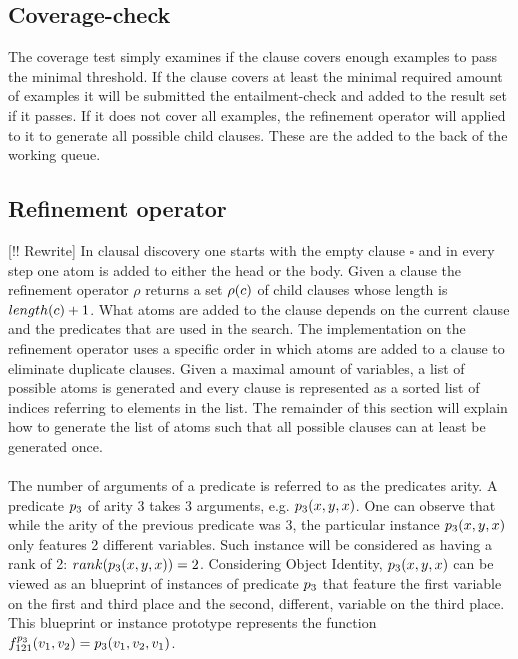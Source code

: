 \subsection{Coverage-check}
The coverage test simply examines if the clause covers enough examples to pass the minimal threshold.
If the clause covers at least the minimal required amount of examples it will be submitted the entailment-check and added to the result set if it passes.
If it does not cover all examples, the refinement operator will applied to it to generate all possible child clauses.
These are the added to the back of the working queue.

\subsection{Refinement operator}
[!! Rewrite]
In clausal discovery one starts with the empty clause $\square$ and in every step one atom is added to either the head or the body.
Given a clause  the refinement operator $\rho$ returns a set $\rho(c)$ of child clauses whose length is $length(c) + 1$.
What atoms are added to the clause depends on the current clause and the predicates that are used in the search.
The implementation on the refinement operator uses a specific order in which atoms are added to a clause to eliminate duplicate clauses.
Given a maximal amount of variables, a list of possible atoms is generated and every clause is represented as a sorted list of indices referring to elements in the list.
The remainder of this section will explain how to generate the list of atoms such that all possible clauses can at least be generated once.
\\\\
The number of arguments of a predicate is referred to as the predicates arity.
A predicate $p_3$ of arity 3 takes 3 arguments, e.g. $p_3(x, y, x)$.
One can observe that while the arity of the previous predicate was 3, the particular instance $p_3(x, y, x)$ only features 2 different variables.
Such instance will be considered as having a rank of 2: $rank(p_3(x, y, x)) = 2$.
Considering Object Identity, $p_3(x, y, x)$ can be viewed as an blueprint of instances of predicate $p_3$ that feature the first variable on the first and third place and the second, different, variable on the third place.
This blueprint or instance prototype represents the function $f^{p_3}_{121}(v_1, v_2) = p_3(v_1, v_2, v_1)$.
\\\\
